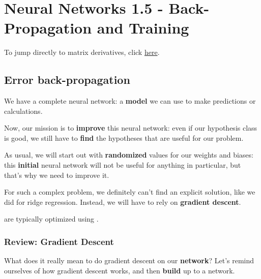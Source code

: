 \setcounter{chapter}{6}

\chapter{Neural Networks 1.5 - Back-Propagation and Training}


To jump directly to matrix derivatives, click \hyperref[mderiv]{here}.

\setcounter{section}{4}
\section{Error back-propagation }

    We have a complete neural network: a \textbf{model} we can use to make predictions or calculations.
    
    Now, our mission is to \textbf{improve} this neural network: even if our hypothesis class is good, we still have to \textbf{find} the hypotheses that are useful for our problem.
    
    As usual, we will start out with \textbf{randomized} values for our weights and biases: this \textbf{initial} neural network will not be useful for anything in particular, but that's why we need to improve it.
    
    For such a complex problem, we definitely can't find an explicit solution, like we did for ridge regression. Instead, we will have to rely on \textbf{gradient descent}.\\
    
    \begin{concept}
         are typically optimized using .
    \end{concept}
    
    \secdiv
    
    \subsection{Review: Gradient Descent}
    
        What does it really mean to do gradient descent on our \textbf{network}? Let's remind ourselves of how gradient descent works, and then \textbf{build} up to a network.
        
